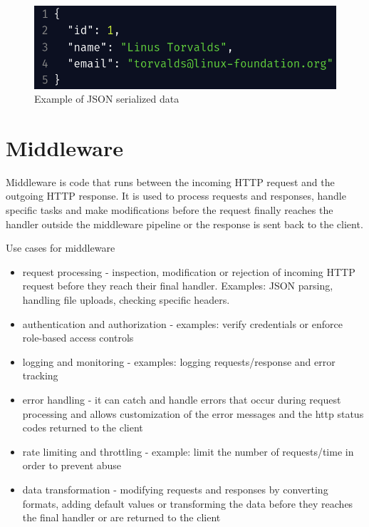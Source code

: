 \begin{figure}[!ht]
    \centering
    \includegraphics[width=1\linewidth]{json-example.png}
    \caption{Example of JSON serialized data}
    \label{fig:json-example}
\end{figure}

\section{Middleware}

\par Middleware is code that runs between the incoming HTTP request and the outgoing HTTP response. It is used to process requests and responses, handle specific tasks and make modifications before the request finally reaches the handler outside the middleware pipeline  or the response is sent back to the client.

\par Use cases for middleware

\begin{itemize}
    \item request processing - inspection, modification or rejection of incoming HTTP request before they reach their final handler. Examples: JSON parsing, handling file uploads, checking specific headers.
    \item authentication and authorization - examples: verify credentials or enforce role-based access controls
    \item logging and monitoring - examples: logging requests/response and error tracking
    \item error handling - it can catch and handle errors that occur during request processing and allows customization of the error messages and the http status codes returned to the client
    \item rate limiting and throttling - example: limit the number of requests/time in order to prevent abuse
    \item data transformation - modifying requests and responses by converting formats, adding default values or transforming the data before they reaches the final handler or are returned to the client 
\end{itemize}

